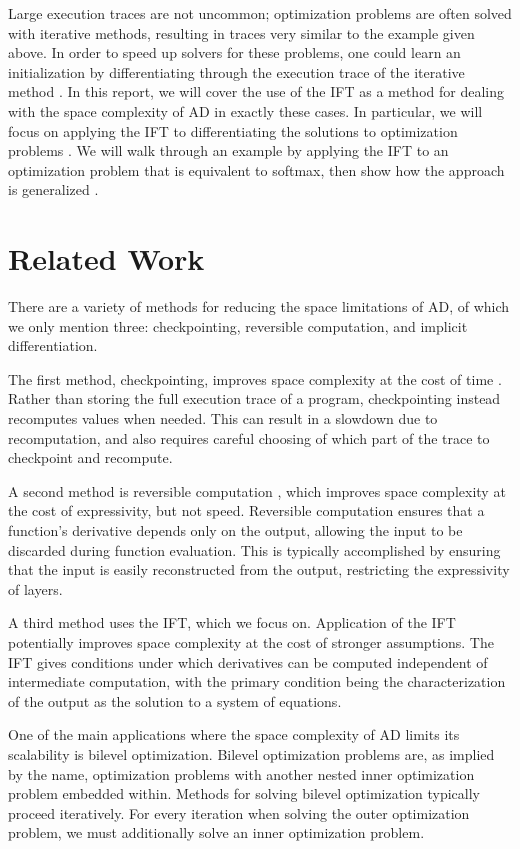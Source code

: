 \documentclass[11pt]{article}
\begin{document}
Large execution traces are not uncommon;
optimization problems are often solved with iterative methods,
resulting in traces very similar to the example given above.
In order to speed up solvers for these problems,
one could learn an initialization by differentiating through the
execution trace of the iterative method \citep{finn2017maml,kim2018savi,neuralinit}.
In this report, we will cover the use of the IFT
as a method for dealing with the space complexity of AD in exactly these cases.
In particular,
we will focus on applying the IFT to differentiating the solutions to optimization problems
\citep{optnet,agrawal2019diffcvx}.
We will walk through an example by applying the IFT to an optimization problem
that is equivalent to softmax,
then show how the approach is generalized \citep{optnet}.

\section{Related Work}
There are a variety of methods for reducing the space limitations of AD,
of which we only mention three: checkpointing, reversible computation, and implicit differentiation.

The first method, checkpointing, improves space complexity at the cost of time \citep{griewank2008autodiff}.
Rather than storing the full execution trace of a program,
checkpointing instead recomputes values when needed.
This can result in a slowdown due to recomputation,
and also requires careful choosing of which part of the trace to checkpoint and recompute.

A second method is reversible computation \citep{maclaurin2015reversible,gomez2017reversible},
which improves space complexity at the cost of expressivity, but not speed.
Reversible computation ensures that a function's derivative depends only on the output,
allowing the input to be discarded during function evaluation.
This is typically accomplished by ensuring that the input is easily reconstructed from the output,
restricting the expressivity of layers.

A third method uses the IFT, which we focus on.
Application of the IFT potentially improves space complexity at the cost of stronger assumptions.
The IFT gives conditions under which derivatives can be computed independent of
intermediate computation,
with the primary condition being the characterization of the output as the solution
to a system of equations.

One of the main applications where the space complexity of AD limits its scalability
is bilevel optimization.
Bilevel optimization problems are, as implied by the name,
optimization problems with another nested inner optimization problem embedded within.
Methods for solving bilevel optimization typically proceed iteratively.
For every iteration when solving the outer optimization problem,
we must additionally solve an inner optimization problem.
\end{document}
